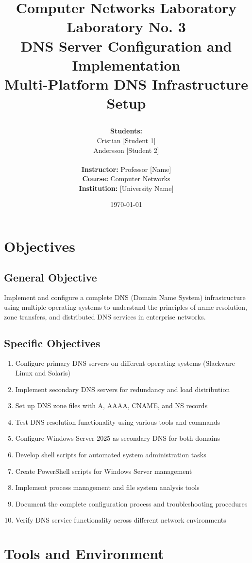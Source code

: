 \documentclass[12pt,a4paper]{article}
\title{\vspace{-2cm}
    \begin{center}
    \end{center}
    \vspace{1cm}
    \textbf{\Large Computer Networks Laboratory}\\
    \vspace{0.5cm}
    \textbf{\huge Laboratory No. 3}\\
    \textbf{\huge DNS Server Configuration and Implementation}\\
    \vspace{1cm}
    \large Multi-Platform DNS Infrastructure Setup
}
\author{
    \textbf{Students:} \\
    Cristian [Student 1] \\
    Andersson [Student 2] \\
    \vspace{0.5cm} \\
    \textbf{Instructor:} Professor [Name] \\
    \textbf{Course:} Computer Networks \\
    \textbf{Institution:} [University Name]
}
\date{\today}
\begin{document}
\maketitle
\thispagestyle{empty}
\newpage

\tableofcontents
\newpage

\section{Objectives}\label{sec:objectives}

\subsection{General Objective}
Implement and configure a complete DNS (Domain Name System) infrastructure using multiple operating systems to understand the principles of name resolution, zone transfers, and distributed DNS services in enterprise networks.

\subsection{Specific Objectives}
\begin{enumerate}
    \item Configure primary DNS servers on different operating systems (Slackware Linux and Solaris)
    \item Implement secondary DNS servers for redundancy and load distribution
    \item Set up DNS zone files with A, AAAA, CNAME, and NS records
    \item Test DNS resolution functionality using various tools and commands
    \item Configure Windows Server 2025 as secondary DNS for both domains
    \item Develop shell scripts for automated system administration tasks
    \item Create PowerShell scripts for Windows Server management
    \item Implement process management and file system analysis tools
    \item Document the complete configuration process and troubleshooting procedures
    \item Verify DNS service functionality across different network environments
\end{enumerate}

\section{Tools and Environment}\label{sec:tools}
\end{document}
